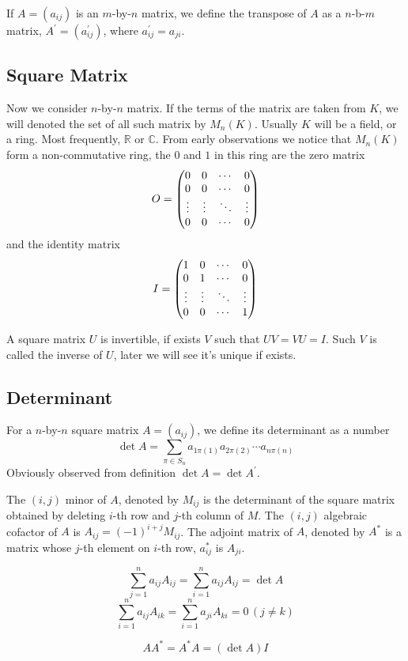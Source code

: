 If $A = (a_{ij})$ is an $m$-by-$n$ matrix,
we define the transpose of $A$ as a $n$-b-$m$ matrix,
$A^\prime = (a^\prime_{ij})$, where $a^\prime_{ij} = a_{ji}$.

\subsection{Square Matrix}
Now we consider $n$-by-$n$ matrix. If the terms of the matrix are taken from $K$,
we will denoted the set of all such matrix by $M_n(K)$. Usually $K$ will be a field,
or a ring. Most frequently, $\mathbb{R}$ or $\mathbb{C}$.
From early observations we notice that $M_n(K)$ form a non-commutative ring,
the $0$ and $1$ in this ring are the zero matrix
$$O = \left(\begin{matrix}
0 & 0 & \cdots & 0 \cr
0 & 0 & \cdots & 0 \cr
\vdots & \vdots & \ddots & \vdots \cr
0 & 0 & \cdots & 0 \cr
\end{matrix}\right)$$
and the identity matrix
$$I = \left(\begin{matrix}
1 & 0 & \cdots & 0 \cr
0 & 1 & \cdots & 0 \cr
\vdots & \vdots & \ddots & \vdots \cr
0 & 0 & \cdots & 1
\end{matrix}\right)$$

A square matrix $U$ is invertible, if exists $V$ such that $UV = VU = I$.
Such $V$ is called the inverse of $U$, later we will see it's unique if exists.

\subsection{Determinant}
For a $n$-by-$n$ square matrix $A = (a_{ij})$, we define its determinant as a number
$$\det A = \sum_{\pi \in S_n} a_{1\pi(1)} a_{2\pi(2)} \cdots a_{n\pi(n)}$$
Obviously observed from definition $\det A = \det A^\prime$.

The $(i, j)$ minor of $A$, denoted by $M_{ij}$ is the determinant of the square matrix
obtained by deleting $i$-th row and $j$-th column of $M$.
The $(i, j)$ algebraic cofactor of $A$ is $A_{ij} = (-1)^{i + j} M_{ij}$.
The adjoint matrix of $A$, denoted by $A^\ast$ is a matrix whose $j$-th element on $i$-th
row, $a^\ast_{ij}$ is $A_{ji}$.

\begin{pro}
$$\sum_{j=1}^n a_{ij} A_{ij} = \sum_{i=1}^n a_{ij} A_{ij} = \det A$$
$$\sum_{i=1}^n a_{ij} A_{ik} = \sum_{i=1}^n a_{ji} A_{ki} = 0 \, (j \neq k)$$
\end{pro}

\begin{cly}
$$A A^\ast = A^\ast A = (\det A) I$$
\end{cly}


